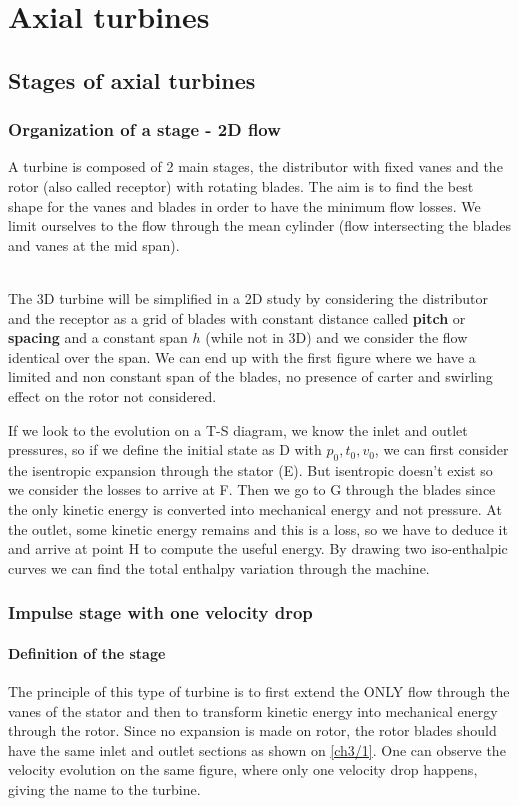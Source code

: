 \chapter{Axial turbines}
\section{Stages of axial turbines}
\subsection{Organization of a stage - 2D flow}
A turbine is composed of 2 main stages, the distributor with fixed vanes and the rotor (also called receptor) with rotating blades. The aim is to find the best shape for the vanes and blades in order to have the minimum flow losses. We limit ourselves to the flow through the mean cylinder (flow intersecting the blades and vanes at the mid span). \\


\ \\
The 3D turbine will be simplified in a 2D study by considering the distributor and the receptor as a grid of blades with constant distance called \textbf{pitch} or \textbf{spacing} and a constant span $h$ (while not in 3D) and we consider the flow identical over the span. We can end up with the first figure where we have a limited and non constant span of the blades, no presence of carter and swirling effect on the rotor not considered. 

If we look to the evolution on a T-S diagram, we know the inlet and outlet pressures, so if we define the initial state as D with $p_0,t_0,v_0$, we can first consider the isentropic expansion through the stator (E). But isentropic doesn't exist so we consider the losses to arrive at F. Then we go to G through the blades since the only kinetic energy is converted into mechanical energy and not pressure. At the outlet, some kinetic energy remains and this is a loss, so we have to deduce it and arrive at point H to compute the useful energy. By drawing two iso-enthalpic curves we can find the total enthalpy variation through the machine. 

\subsection{Impulse stage with one velocity drop}
\subsubsection{Definition of the stage}
The principle of this type of turbine is to first extend the ONLY flow through the vanes of the stator and then to transform kinetic energy into mechanical energy through the rotor. Since no expansion is made on rotor, the rotor blades should have the same inlet and outlet sections as shown on \autoref{ch3/1}. One can observe the velocity evolution on the same figure, where only one velocity drop happens, giving the name to the turbine. 

